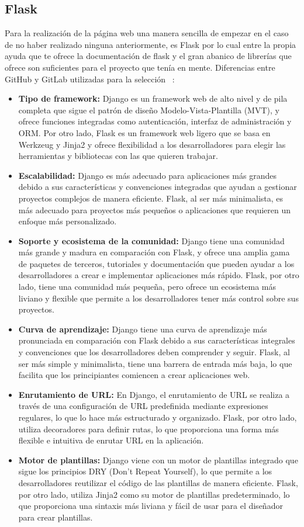 \subsection{Flask}
Para la realización de la página web una manera sencilla de empezar en el caso de no haber realizado ninguna anteriormente, es Flask por lo cual entre la propia ayuda que te ofrece la documentación de flask y el gran abanico de librerías que ofrece son suficientes para el proyecto que tenía en mente.
Diferencias entre GitHub y GitLab utilizadas para la selección ~\cite{Flask-Django}:
\begin{itemize}
    \item \textbf{Tipo de framework:} Django es un framework web de alto nivel y de pila completa que sigue el patrón de diseño Modelo-Vista-Plantilla (MVT), y ofrece funciones integradas como autenticación, interfaz de administración y ORM. Por otro lado, Flask es un framework web ligero que se basa en Werkzeug y Jinja2 y ofrece flexibilidad a los desarrolladores para elegir las herramientas y bibliotecas con las que quieren trabajar.
    \item \textbf{Escalabilidad:} Django es más adecuado para aplicaciones más grandes debido a sus características y convenciones integradas que ayudan a gestionar proyectos complejos de manera eficiente. Flask, al ser más minimalista, es más adecuado para proyectos más pequeños o aplicaciones que requieren un enfoque más personalizado.
    \item \textbf{Soporte y ecosistema de la comunidad:} Django tiene una comunidad más grande y madura en comparación con Flask, y ofrece una amplia gama de paquetes de terceros, tutoriales y documentación que pueden ayudar a los desarrolladores a crear e implementar aplicaciones más rápido. Flask, por otro lado, tiene una comunidad más pequeña, pero ofrece un ecosistema más liviano y flexible que permite a los desarrolladores tener más control sobre sus proyectos.
    \item \textbf{Curva de aprendizaje:} Django tiene una curva de aprendizaje más pronunciada en comparación con Flask debido a sus características integrales y convenciones que los desarrolladores deben comprender y seguir. Flask, al ser más simple y minimalista, tiene una barrera de entrada más baja, lo que facilita que los principiantes comiencen a crear aplicaciones web.
    \item \textbf{Enrutamiento de URL:} En Django, el enrutamiento de URL se realiza a través de una configuración de URL predefinida mediante expresiones regulares, lo que lo hace más estructurado y organizado. Flask, por otro lado, utiliza decoradores para definir rutas, lo que proporciona una forma más flexible e intuitiva de enrutar URL en la aplicación.
    \item \textbf{Motor de plantillas:} Django viene con un motor de plantillas integrado que sigue los principios DRY (Don't Repeat Yourself), lo que permite a los desarrolladores reutilizar el código de las plantillas de manera eficiente. Flask, por otro lado, utiliza Jinja2 como su motor de plantillas predeterminado, lo que proporciona una sintaxis más liviana y fácil de usar para el diseñador para crear plantillas.
\end{itemize}

